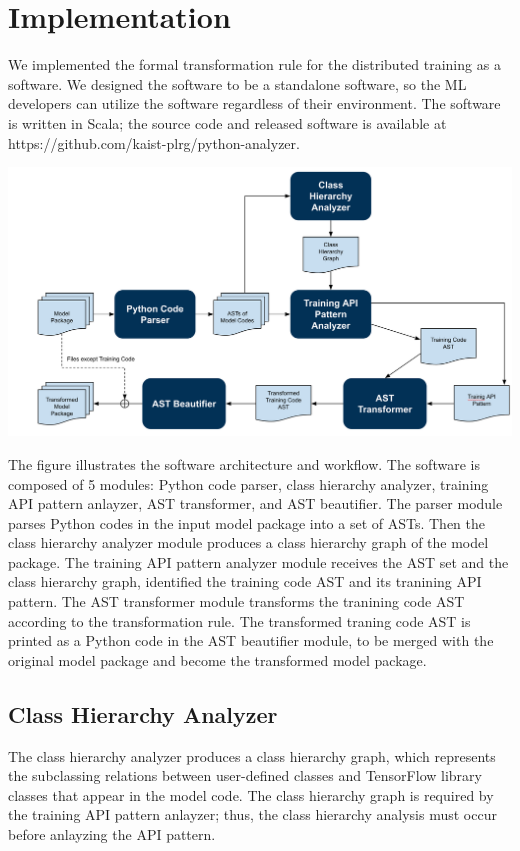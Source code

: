 \section{Implementation}\label{sec:impl}


We implemented the formal transformation rule for the distributed training
as a software. We designed the software to be a standalone software, so 
the ML developers can utilize the software regardless of their environment. 
The software is written in Scala; the source code and released software
is available at https://github.com/kaist-plrg/python-analyzer. 

\includegraphics[width=15cm]{system_arch}

The figure illustrates the software architecture and workflow.
The software is composed of 5 modules:
Python code parser, class hierarchy analyzer,
training API pattern anlayzer, AST transformer, and AST beautifier.
The parser module parses Python codes in the input model package into 
a set of ASTs. Then the class hierarchy analyzer module 
produces a class hierarchy graph of the model package.
The training API pattern analyzer module receives the AST set and
the class hierarchy graph, identified the training code AST and
its tranining API pattern. The AST transformer module
transforms the tranining code AST according to the transformation rule.
The transformed traning code AST is printed as a Python code in the
AST beautifier module, to be merged with the original model package
and become the transformed model package.

\subsection{Class Hierarchy Analyzer}

The class hierarchy analyzer produces a class hierarchy graph, which
represents the subclassing relations between user-defined classes
and TensorFlow library classes that appear in the model code.
The class hierarchy graph is required by the training API pattern anlayzer;
thus, the class hierarchy analysis must occur before anlayzing the API pattern.

